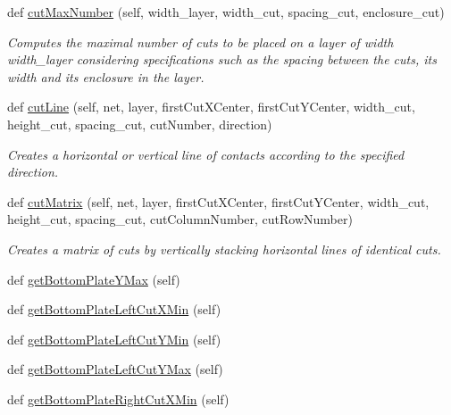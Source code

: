 \begin{DoxyCompactItemize}
def \mbox{\hyperlink{classpython_1_1capacitorunit_1_1CapacitorUnit_ad927ede3cda234b24660b9286a2d68df}{cut\+Max\+Number}} (self, width\+\_\+layer, width\+\_\+cut, spacing\+\_\+cut, enclosure\+\_\+cut)
\begin{DoxyCompactList}\small\item\em Computes the maximal number of cuts to be placed on a layer of width {\ttfamily width\+\_\+layer} considering specifications such as the spacing between the cuts, its width and its enclosure in the layer. \end{DoxyCompactList}\item 
def \mbox{\hyperlink{classpython_1_1capacitorunit_1_1CapacitorUnit_aa453563e9c329010f89e4b566fc4768d}{cut\+Line}} (self, net, layer, first\+Cut\+X\+Center, first\+Cut\+Y\+Center, width\+\_\+cut, height\+\_\+cut, spacing\+\_\+cut, cut\+Number, direction)
\begin{DoxyCompactList}\small\item\em Creates a horizontal or vertical line of contacts according to the specified direction. \end{DoxyCompactList}\item 
def \mbox{\hyperlink{classpython_1_1capacitorunit_1_1CapacitorUnit_ab29fb045a7f82b35194cbb94892fd1a1}{cut\+Matrix}} (self, net, layer, first\+Cut\+X\+Center, first\+Cut\+Y\+Center, width\+\_\+cut, height\+\_\+cut, spacing\+\_\+cut, cut\+Column\+Number, cut\+Row\+Number)
\begin{DoxyCompactList}\small\item\em Creates a matrix of cuts by vertically stacking horizontal lines of identical cuts. \end{DoxyCompactList}\item 
def \mbox{\hyperlink{classpython_1_1capacitorunit_1_1CapacitorUnit_a11ae88c08d4e8b91d584d4a4f69c452d}{get\+Bottom\+Plate\+Y\+Max}} (self)
\item 
def \mbox{\hyperlink{classpython_1_1capacitorunit_1_1CapacitorUnit_a62e0decc5c4a2f1484743acffaf50a1a}{get\+Bottom\+Plate\+Left\+Cut\+X\+Min}} (self)
\item 
def \mbox{\hyperlink{classpython_1_1capacitorunit_1_1CapacitorUnit_a88182f71df23236f152d02855d8f92f4}{get\+Bottom\+Plate\+Left\+Cut\+Y\+Min}} (self)
\item 
def \mbox{\hyperlink{classpython_1_1capacitorunit_1_1CapacitorUnit_a5926a16b566714d884de27edb29e86d0}{get\+Bottom\+Plate\+Left\+Cut\+Y\+Max}} (self)
\item 
def \mbox{\hyperlink{classpython_1_1capacitorunit_1_1CapacitorUnit_ad3956fe34a545d496e62f0a499427e69}{get\+Bottom\+Plate\+Right\+Cut\+X\+Min}} (self)

\end{DoxyCompactItemize}
